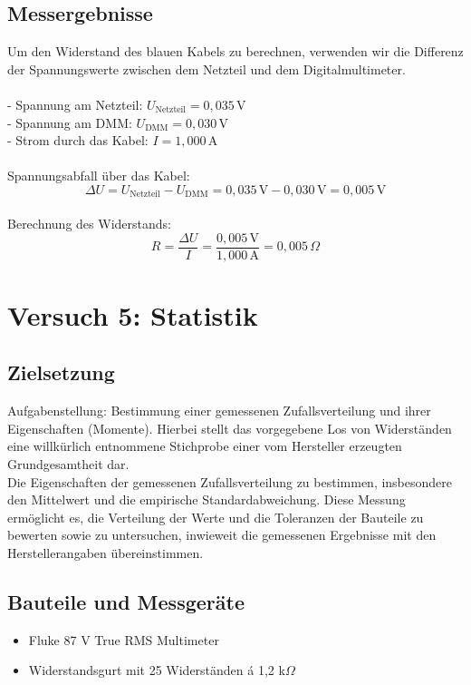 \documentclass[a4paper,12pt]{article}
\begin{document}
\subsection{Messergebnisse}
Um den Widerstand des blauen Kabels zu berechnen, verwenden wir die Differenz der Spannungswerte zwischen dem Netzteil und dem Digitalmultimeter.\\\\
   - Spannung am Netzteil: \( U_{\text{Netzteil}} = 0,035 \, \text{V} \) \\
   - Spannung am DMM: \( U_{\text{DMM}} = 0,030 \, \text{V} \) \\
   - Strom durch das Kabel: \( I = 1,000 \, \text{A} \) \\\\
Spannungsabfall über das Kabel:
   \[
   \Delta U = U_{\text{Netzteil}} - U_{\text{DMM}} = 0,035 \, \text{V} - 0,030 \, \text{V} = 0,005 \, \text{V}
   \]\\
Berechnung des Widerstands:
   \[
   R = \frac{\Delta U}{I} = \frac{0,005 \, \text{V}}{1,000 \, \text{A}} = 0,005 \, \Omega
   \]

\newpage
\section{Versuch 5: Statistik}
\subsection{Zielsetzung}
Aufgabenstellung: Bestimmung einer gemessenen Zufallsverteilung und ihrer Eigenschaften (Momente). Hierbei stellt
das vorgegebene Los von Widerständen eine willkürlich entnommene Stichprobe einer vom
Hersteller erzeugten Grundgesamtheit dar.\\
\noindent Die Eigenschaften der gemessenen Zufallsverteilung zu bestimmen, insbesondere den Mittelwert und die empirische Standardabweichung. Diese Messung ermöglicht es, die Verteilung der Werte und die Toleranzen der Bauteile zu bewerten sowie zu untersuchen, inwieweit die gemessenen Ergebnisse mit den Herstellerangaben übereinstimmen.


\subsection{Bauteile und Messgeräte}
\begin{itemize}
\item Fluke 87 V True RMS Multimeter
\item Widerstandsgurt mit 25 Widerständen á 1,2 k$\Omega$
\end{itemize}
\end{document}
